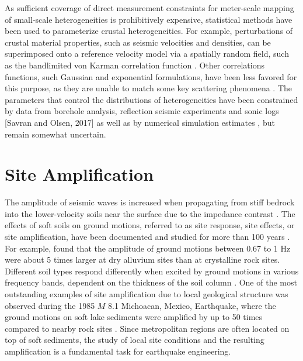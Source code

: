 As sufficient coverage of direct measurement constraints for meter-scale mapping of small-scale heterogeneities is prohibitively expensive, statistical methods have been used to parameterize crustal heterogeneities. For example, perturbations of crustal material properties, such as seismic velocities and densities, can be superimposed onto a reference velocity model via a spatially random field, such as the bandlimited von Karman correlation function \citep[][\cref{app:A}]{frankelFiniteDifferenceSimulations1986,hartzellEffects3DRandom2010}. Other correlations functions, such Gaussian and exponential formulations, have been less favored for this purpose, as they are unable to match some key scattering phenomena \citep{frankelFiniteDifferenceSimulations1986}. The parameters that control the distributions of heterogeneities have been constrained by data from borehole analysis, reflection seismic experiments and sonic logs [Savran and Olsen, 2017]   as well as by numerical simulation estimates \citep{thyboSeismicScatteringTop2003,nielsenIdentificationCrustalUpper2006, przybillaEstimationCrustalScattering2009, imperatoriBroadbandNearfieldGround2013, imperatoriRoleTopographyLateral2015}, but remain somewhat uncertain.


\section{Site Amplification}

The amplitude of seismic waves is increased when propagating from stiff bedrock into the lower-velocity soils near the surface due to the impedance contrast \citep{booreShortperiodSwaveRadiation1986,silvaEngineeringCharacterizationStrong1995}. The effects of soft soils on ground motions, referred to as site response, site effects, or site amplification, have been documented and studied for more than 100 years . For example, \citet{gutenbergEffectsGroundEarthquake1957} found that the amplitude of ground motions between 0.67 to 1 Hz were about 5 times larger at dry alluvium sites than at crystalline rock sites.  Different soil types respond differently when excited by ground motions in various frequency bands, dependent on the thickness of the soil column \citep{akiLocalSiteEffects1993}. One of the most outstanding examples of site amplification due to local geological structure was observed during the 1985 $M$ 8.1 Michoacan, Mexico, Earthquake, where the ground motions on soft lake sediments were amplified by up to 50 times compared to nearby rock sites \citep{singh1993origin}. Since metropolitan regions are often located on top of soft sediments, the study of local site conditions and the resulting amplification is a fundamental task for earthquake engineering.

